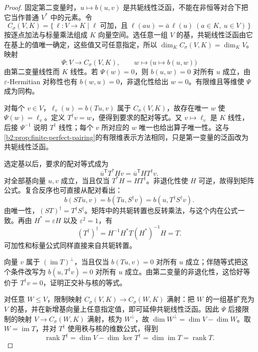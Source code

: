 \begin{proof}
	固定第二变量时，\(u\mapsto b(u,v)\) 是共轭线性泛函，不能在非恒等对合下把它当作普通 \(V^*\) 中的元素。令
	\[
		C_\sigma(V,K)= \{\,\ell:V\to K\mid \ell\;\text{可加，且}\;\ell(au)=\bar a\,\ell(u) \ (a\in K,\ u\in V)\,\}
	\]
	按逐点加法与标量乘法组成 \(K\) 向量空间。选任意一组 \(V\) 的基，共轭线性泛函由它在基上的值唯一确定，这些值又可任意指定，所以 \(\dim_K C_\sigma(V,K)=\dim_KV\)。映射
	\[
		\Psi:V\longrightarrow C_\sigma(V,K),\qquad w\longmapsto \bigl(u\longmapsto b(u,w)\bigr)
	\]
	由第二变量线性而 \(K\) 线性。若 \(\Psi(w)=0\)，则 \(b(u,w)=0\) 对所有 \(u\) 成立，由 \(\varepsilon\)-Hermitian 对称性也有 \(b(w,u)=0\)，非退化性给出 \(w=0\)。有限维且等维使 \(\Psi\) 成为同构。

	对每个 \(v\in V\)，\(\ell_v(u)=b(Tu,v)\) 属于 \(C_\sigma(V,K)\)，故存在唯一 \(w\) 使 \(\Psi(w)=\ell_v\)。定义 \(T^\dagger v=w\)，便得到要求的配对等式。又 \(v\mapsto\ell_v\) 是 \(K\) 线性，后接 \(\Psi^{-1}\) 说明 \(T^\dagger\) 线性；每个 \(v\) 所对应的 \(w\) 唯一也给出算子唯一性。这与\cref{b2:prop:finite-perfect-pairing}的有限维表示方法相同，只是第一变量的泛函改为共轭线性泛函。

	选定基以后，要求的配对等式成为
	\[
		\overline u^{\mathsf T}T^*Hv =\overline u^{\mathsf T}HT^\dagger v.
	\]
	对全部基向量 \(u,v\) 成立，当且仅当 \(T^*H=HT^\dagger\)。非退化性使 \(H\) 可逆，故得到矩阵公式。复合反序也可直接从配对看出：
	\[
		b(STu,v)=b(Tu,S^\dagger v) =b(u,T^\dagger S^\dagger v).
	\]
	由唯一性，\((ST)^\dagger=T^\dagger S^\dagger\)。矩阵中的共轭转置也反转乘法，与这个内在公式一致。再由 \(H^*=\varepsilon H\) 以及 \(\varepsilon^2=1\)，有
	\[
		(T^\dagger)^\dagger =H^{-1}H^*T(H^*)^{-1}H=T.
	\]
	可加性和标量公式同样直接来自共轭转置。

	向量 \(v\) 属于 \((\operatorname{im}T)^\perp\)，当且仅当 \(b(Tu,v)=0\) 对所有 \(u\) 成立；伴随等式把这个条件改写为 \(b(u,T^\dagger v)=0\) 对所有 \(u\) 成立。由第二变量的非退化性，这恰好等价于 \(T^\dagger v=0\)，证明正交补与核的等式。

	对任意 \(W\le V\)，限制映射 \(C_\sigma(V,K)\to C_\sigma(W,K)\) 满射：把 \(W\) 的一组基扩充为 \(V\) 的基，并在新增基向量上任意指定值，即可延伸共轭线性泛函。因此 \(\Psi\) 后接限制的映射 \(V\to C_\sigma(W,K)\) 满射，核为 \(W^\perp\)，故 \(\dim W^\perp=\dim V-\dim W\)。取 \(W=\operatorname{im}T\)，并对 \(T^\dagger\) 使用秩与核的维数公式，得到
	\[
		\operatorname{rank}T^\dagger =\dim V-\dim\ker T^\dagger =\dim\operatorname{im}T=\operatorname{rank}T.
	\]
\end{proof}

